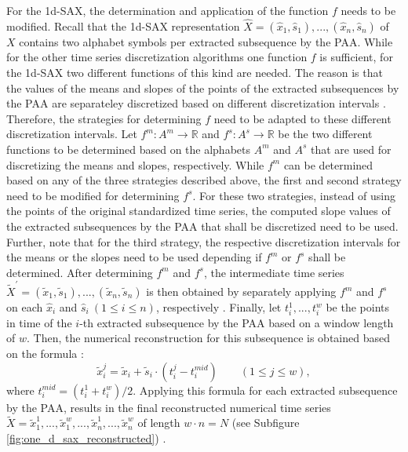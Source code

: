 For the \ac{1d-SAX}, the determination and application of the function $f$ needs to be modified. Recall that the \ac{1d-SAX} representation $\hat{X} = (\hat{x}_1,\hat{s}_1), ..., (\hat{x}_n,\hat{s}_n)$ of $X$ contains two alphabet symbols per extracted subsequence by the \ac{PAA}. While for the other time series discretization algorithms one function $f$ is sufficient, for the \ac{1d-SAX} two different functions of this kind are needed. The reason is that the values of the means and slopes of the points of the extracted subsequences by the \ac{PAA} are separateley discretized based on different discretization intervals \cite{1d-SAX}. Therefore, the strategies for determining $f$ need to be adapted to these different discretization intervals. Let $f^m: A^m \rightarrow \mathbb{R}$ and $f^s: A^s \rightarrow \mathbb{R}$ be the two different functions to be determined based on the alphabets $A^m$ and $A^s$ that are used for discretizing the means and slopes, respectively. While $f^m$ can be determined based on any of the three strategies described above, the first and second strategy need to be modified for determining $f^s$. For these two strategies, instead of using the points of the original standardized time series, the computed slope values of the extracted subsequences by the \ac{PAA} that shall be discretized need to be used. Further, note that for the third strategy, the respective discretization intervals for the means or the slopes need to be used depending if $f^m$ or $f^s$ shall be determined. After determining $f^m$ and $f^s$, the intermediate time series $\tilde{X}^{'} = (\tilde{x}_1,\tilde{s}_1), ..., (\tilde{x}_n,\tilde{s}_n)$ is then obtained by separately applying $f^m$ and $f^s$ on each $\hat{x}_i$ and $\hat{s}_i \ (1 \leq i \leq n)$, respectively \cite{1d-SAX}. \newline
Finally, let $t_{i}^{1}, ..., t_{i}^{w}$ be the points in time of the $i$-th extracted subsequence by the \ac{PAA} based on a window length of $w$. Then, the numerical reconstruction for this subsequence is obtained based on the formula \cite{1d-SAX}:
\begin{equation*}
\tilde{x}_{i}^{j} = \tilde{x}_i + \tilde{s}_i \cdot (t_{i}^{j} - t_{i}^{mid}) \qquad (1 \leq j \leq w),
\end{equation*}
where $t_{i}^{mid} = (t_{i}^{1} + t_{i}^{w}) / 2$. Applying this formula for each extracted subsequence by the \ac{PAA}, results in the final reconstructed numerical time series $\tilde{X} = \tilde{x}_{1}^{1}, ...,\tilde{x}_{1}^{w}, ...,\tilde{x}_{n}^{1}, ...,\tilde{x}_{n}^{w}$ of length $w \cdot n = N$ (see Subfigure \ref{fig:one_d_sax_reconstructed}) \cite{1d-SAX}.
